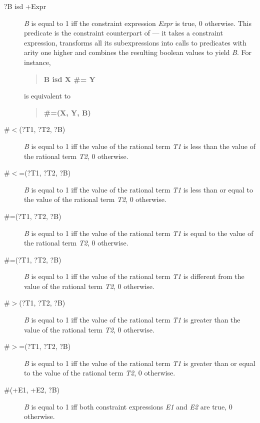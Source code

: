 \begin{description}
\item[?B isd +Expr]
{\it B} is equal to 1 iff
the constraint expression {\it Expr} is true, 0 otherwise.
This predicate is the constraint counterpart of  ---
it takes a constraint expression, transforms all its subexpressions
into calls to predicates with arity one higher and combines
the resulting boolean values to yield {\it B}.
For instance,
\begin{quote}
{\bf B isd X \#= Y}
\end{quote}
is equivalent to
\begin{quote}
{\bf \#=(X, Y, B)}
\end{quote}

\item[\#$<$(?T1, ?T2, ?B)]
{\it B} is equal to 1 iff
the value of the rational term {\it T1} is less than the value of the
rational term {\it T2}, 0 otherwise.

\item[\#$<$=(?T1, ?T2, ?B)]
{\it B} is equal to 1 iff
the value of the rational term {\it T1} is less than or equal to the value of the
rational term {\it T2}, 0 otherwise.

\item[\#=(?T1, ?T2, ?B)]
{\it B} is equal to 1 iff
the value of the rational term {\it T1} is equal to the
value of the rational term {\it T2}, 0 otherwise.

\item[\#\bsl=(?T1, ?T2, ?B)]
{\it B} is equal to 1 iff
the value of the rational term {\it T1} is different from the
value of the rational term {\it T2}, 0 otherwise.

\item[\#$>$(?T1, ?T2, ?B)]
{\it B} is equal to 1 iff
the value of the rational term {\it T1} is greater than the
value of the rational term {\it T2}, 0 otherwise.

\item[\#$>$=(?T1, ?T2, ?B)]
{\it B} is equal to 1 iff
the value of the rational term {\it T1} is greater than or equal to the
value of the rational term {\it T2}, 0 otherwise.


\item[\#\andsy(+E1, +E2, ?B)]
{\it B} is equal to 1 iff
both constraint expressions {\it E1} and {\it E2} are true,
0 otherwise.


\end{description}
